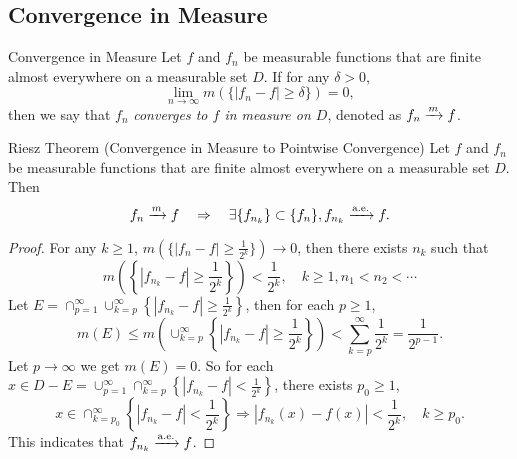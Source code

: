 \subsection{Convergence in Measure}

\begin{definition}{Convergence in Measure}{}
  Let $f$ and $f_n$ be measurable functions that are finite almost everywhere on
  a measurable set $D$. If for any $\delta > 0$,
  \begin{equation}
    \lim \limits _{n \rightarrow \infty} m(\{|f_n - f| \geq \delta\}) = 0,
  \end{equation}
  then we say that $f_n$ \emph{converges to $f$ in measure on $D$},
  denoted as $f_n \xrightarrow{m} f$.
\end{definition}

\begin{theorem}{Riesz Theorem (Convergence in Measure to Pointwise Convergence)}{}
  Let $f$ and $f_n$ be measurable functions that are finite almost everywhere on
  a measurable set $D$. Then
  \begin{equation}
    f_n \xrightarrow{m} f \quad \Rightarrow \quad \exists \{f_{n_k}\} \subset \{f_n\}, f_{n_k} \xrightarrow{\text{a.e.}} f.
  \end{equation}
\end{theorem}

\begin{proof}
  For any $k \geq 1$, $m \left( \{ |f_n - f| \geq \frac{1}{2^k}\} \right)
  \rightarrow 0$, then there exists $n_k$ such that
  \begin{equation}
    m \left( \left\{ |f_{n_k} - f| \geq \frac{1}{2^k} \right\} \right) < \frac{1}{2^k},
    \quad k \geq 1, n_1 < n_2 < \cdots
  \end{equation}
  Let $E = \cap _{p = 1}^{\infty} \cup _{k = p}^{\infty} \left\{ |f_{n_k} - f|
    \geq \frac{1}{2^k} \right\}$,
  then for each $p \geq 1$,
  \begin{equation}
    m(E) \leq m \left( \cup _{k = p}^{\infty} \left\{ |f_{n_k} - f| \geq \frac{1}{2^k} \right\} \right)
    < \sum\limits_{k = p}^{\infty} \frac{1}{2^k} = \frac{1}{2^{p-1}}.
  \end{equation}
  Let $p \rightarrow \infty$ we get $m(E) = 0$.
  So for each $x \in D - E = \cup _{p = 1}^{\infty} \cap _{k = p}^{\infty}
  \left\{ |f_{n_k} - f| < \frac{1}{2^k} \right\}$,
  there exists $p_0 \geq 1$, 
  \begin{equation}
    x \in \cap _{k = p_0}^{\infty} \left\{ |f_{n_k} - f| < \frac{1}{2^k} \right\}
    \Rightarrow
    |f_{n_k}(x) - f(x)| < \frac{1}{2^k}, \quad k \geq p_0.
  \end{equation}
  This indicates that $f_{n_k} \xrightarrow{\text{a.e.}} f$.
\end{proof}

